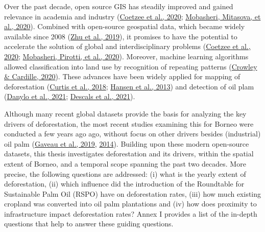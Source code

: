 \documentclass[
  letterpaper,
  DIV=11,
  numbers=noendperiod]{scrreprt}
\begin{document}
Over the past decade, open source GIS has steadily improved and gained
relevance in academia and industry
(\protect\hyperlink{ref-coetzeeOpenGeospatialSoftware2020}{Coetzee et
al., 2020};
\protect\hyperlink{ref-mobasheriHighlightingRecentTrends2020}{Mobasheri,
Mitasova, et al., 2020}). Combined with open-source geospatial data,
which became widely available since 2008
(\protect\hyperlink{ref-zhuBenefitsFreeOpen2019}{Zhu et al., 2019}), it
promises to have the potential to accelerate the solution of global and
interdisciplinary problems
(\protect\hyperlink{ref-coetzeeOpenGeospatialSoftware2020}{Coetzee et
al., 2020};
\protect\hyperlink{ref-mobasheriOpensourceGeospatialTools2020}{Mobasheri,
Pirotti, et al., 2020}). Moreover, machine learning algorithms allowed
classification into land use by recognition of repeating patterns
(\protect\hyperlink{ref-crowleyRemoteSensingRecent2020}{Crowley \&
Cardille, 2020}). These advances have been widely applied for mapping of
deforestation
(\protect\hyperlink{ref-curtisClassifyingDriversGlobal2018}{Curtis et
al., 2018};
\protect\hyperlink{ref-hansenHighResolutionGlobalMaps2013}{Hansen et
al., 2013}) and detection of oil plam
(\protect\hyperlink{ref-danyloMapExtentYear2021}{Danylo et al., 2021};
\protect\hyperlink{ref-descalsHighresolutionGlobalMap2021}{Descals et
al., 2021}).

Although many recent global datasets provide the basis for analyzing the
key drivers of deforestation, the most recent studies examining this for
Borneo were conducted a few years ago ago, without focus on other
drivers besides (industrial) oil palm
(\protect\hyperlink{ref-gaveauRiseFallForest2019}{Gaveau et al., 2019},
\protect\hyperlink{ref-gaveauFourDecadesForest2014}{2014}). Building
upon these modern open-source datasets, this thesis investigates
deforestation and its drivers, within the spatial extent of Borneo, and
a temporal scope spanning the past two decades. More precise, the
following questions are addressed: (i) what is the yearly extent of
deforestation, (ii) which influence did the introduction of the
Roundtable for Sustainable Palm Oil (RSPO) have on deforestation rates,
(iii) how much existing cropland was converted into oil palm plantations
and (iv) how does proximity to infrastructure impact deforestation
rates? Annex I provides a list of the in-depth questions that help to
answer these guiding questions.
\end{document}
